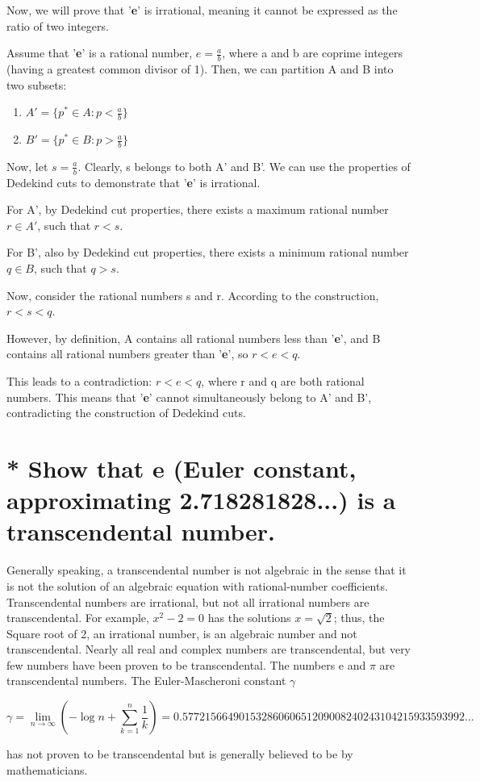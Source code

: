\documentclass{article}
\begin{document}
Now, we will prove that '\textbf{e}' is irrational, meaning it cannot be expressed as the ratio of two integers.

Assume that '\textbf{e}' is a rational number, $e = \frac{a}{b}$, where a and b are coprime integers (having a greatest common divisor of 1). Then, we can partition A and B into two subsets:

\begin{enumerate}
  \item $A' = \{p^* \in A: p < \frac{a}{b} \}$
  \item $B' = \{p^* \in B: p > \frac{a}{b} \}$
\end{enumerate}

Now, let $s = \frac{a}{b}$. Clearly, s belongs to both A' and B'. We can use the properties of Dedekind cuts to demonstrate that '\textbf{e}' is irrational.

For A', by Dedekind cut properties, there exists a maximum rational number $r \in A'$, such that $r < s$.

For B', also by Dedekind cut properties, there exists a minimum rational number $q \in B$, such that $q > s$.

Now, consider the rational numbers s and r. According to the construction, $r < s < q$.

However, by definition, A contains all rational numbers less than '\textbf{e}', and B contains all rational numbers greater than '\textbf{e}', so $r < e < q$.

This leads to a contradiction: $r < e < q$, where r and q are both rational numbers. This means that '\textbf{e}' cannot simultaneously belong to A' and B', contradicting the construction of Dedekind cuts.


\section{* Show that e (Euler constant, approximating 2.718281828...) is a transcendental number.}

\begin{tcolorbox}
  Generally speaking, a transcendental number is not algebraic in the sense that it is not the solution of an algebraic equation with rational-number coeﬀicients. Transcendental numbers are irrational, but not all irrational numbers are transcendental. For example, $x^2 - 2 = 0$ has the solutions $x = \sqrt{2}$; thus, the Square root of 2, an irrational number, is an algebraic number and not transcendental. Nearly all real and complex numbers are transcendental, but very few numbers have been proven to be transcendental. The numbers e and $ \pi $ are transcendental numbers. The Euler-Mascheroni constant $\gamma $
  
  \begin{equation*}
    \gamma = \lim_{n \to \infty}(- \log n+\sum_{k = 1}^{n} \frac{1}{k}  ) = 0.57721566490153286060651209008240243104215933593992\ldots      
  \end{equation*}
  
  has not proven to be transcendental but is generally believed to be by mathematicians.
\end{tcolorbox}
\end{document}
